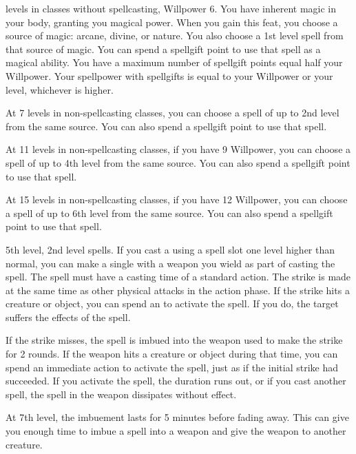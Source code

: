      levels in classes without spellcasting, Willpower 6.
    \featben You have inherent magic in your body, granting you magical power.
    When you gain this feat, you choose a source of magic: arcane, divine, or nature.
    You also choose a 1st level spell from that source of magic.
    You can spend a spellgift point to use that spell as a magical ability.
    You have a maximum number of spellgift points equal half your Willpower.
    Your spellpower with spellgifts is equal to your Willpower or your level, whichever is higher.

    At 7 levels in non-spellcasting classes, you can choose a spell of up to 2nd level from the same source. You can also spend a spellgift point to use that spell.

    At 11 levels in non-spellcasting classes, if you have 9 Willpower, you can choose a spell of up to 4th level from the same source. You can also spend a spellgift point to use that spell.

    At 15 levels in non-spellcasting classes, if you have 12 Willpower, you can choose a spell of up to 6th level from the same source. You can also spend a spellgift point to use that spell.

    \featpre 5th level, 2nd level spells.
    \featben If you cast a  using a spell slot one level higher than normal, you can make a single  with a weapon you wield as part of casting the spell.
    The spell must have a casting time of a standard action.
    The strike is made at the same time as other physical attacks in the action phase.
    If the strike hits a creature or object, you can spend an  to activate the spell.
    If you do, the target suffers the effects of the spell.

    If the strike misses, the spell is imbued into the weapon used to make the strike for 2 rounds.
    If the weapon hits a creature or object during that time, you can spend an immediate action to activate the spell, just as if the initial strike had succeeded.
    If you activate the spell, the duration runs out, or if you cast another spell, the spell in the weapon dissipates without effect.

    At 7th level, the imbuement lasts for 5 minutes before fading away.
    This can give you enough time to imbue a spell into a weapon and give the weapon to another creature.

